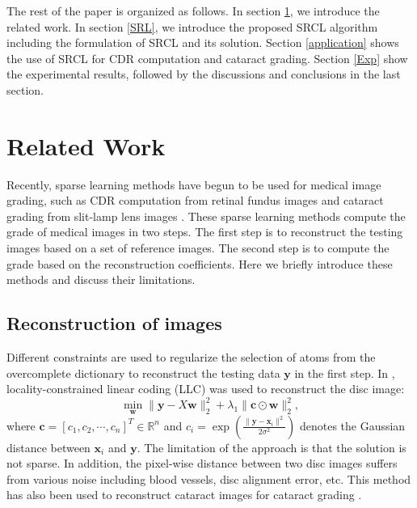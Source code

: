 \documentclass[journal]{IEEEtran}
\begin{document}
     The rest of the paper is organized as follows. In section \ref{related}, we introduce the related work. In section \ref{SRL}, we introduce  the proposed  SRCL algorithm including the formulation of SRCL and its solution.  Section \ref{application}
     shows the use of SRCL for CDR computation  and cataract grading.
     Section \ref{Exp} show the experimental results, followed by the discussions and conclusions in the last section.

     \section{Related Work} \label{related}
   Recently, sparse learning methods have begun to be used for medical image grading, such as CDR computation from retinal fundus images \cite{YW13, CJ15, Cheng:17BOE} and cataract grading from slit-lamp lens images \cite{Xu13}.  These sparse learning methods compute the grade of medical images in two steps. The first step is to  reconstruct the testing  images based on a set of reference   images. The second step is to compute the grade based on the reconstruction coefficients. Here we briefly introduce these methods and discuss their limitations.
    \subsection{Reconstruction of images}
        Different constraints are used to regularize the selection of atoms from the overcomplete dictionary to reconstruct the testing data $\textbf{y}$ in the first step.
    In \cite{YW13},   locality-constrained linear coding (LLC) \cite{llc2010} was used to reconstruct the disc image:
        \begin{equation}
    \min_{\textbf{w}} \|{\textbf{y}}-{X}\textbf{w}\|^2_2+\lambda_1  \|\textbf{c}\odot \textbf{w}\|_2^2, \label{llcobj}
    \end{equation}
    where $\textbf{c}=[c_1, c_2, \cdots, c_n]^T\in \mathbb{R}^n$ and $c_i= \exp(\frac{\|\textbf{y}-\textbf{x}_i\|^2}{2\sigma^2})$ denotes the Gaussian distance  between $\textbf{x}_i$ and $\textbf{y}$.
    The limitation of the approach is that the solution is not sparse. In addition, the pixel-wise distance between two disc
    images suffers from various noise including blood vessels, disc alignment error, etc.
  This method has also been used to reconstruct cataract images for cataract grading \cite{yanwu2016}.
\end{document}

